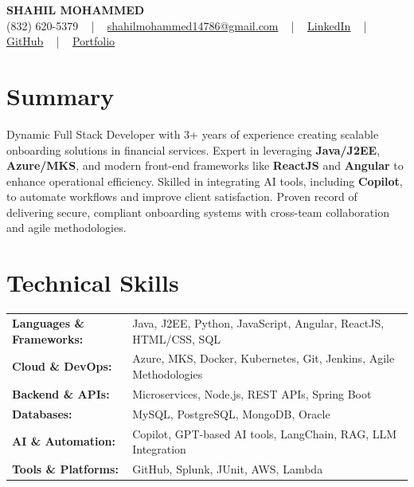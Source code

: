 \documentclass[letterpaper,11pt]{article}
\begin{document}
\begin{center}
    {\fontsize{14pt}{12pt}\selectfont \textbf{\MakeUppercase{Shahil Mohammed}}}\\ \vspace{2pt}
    \fontsize{10pt}{12pt}\selectfont (832) 620-5379 ~ | ~ \href{mailto:shahilmohammed14786@gmail.com}{shahilmohammed14786@gmail.com} ~ | ~  
    \href{https://www.linkedin.com/in/shahil-mohammed-9652931a1/}{\color{blue}\underline{LinkedIn}}  ~ | ~ 
    \href{https://github.com/freakbeast14}{\color{blue}\underline{GitHub}} ~ | ~ 
    \href{https://shahil-mohammed.netlify.app/}{\color{blue}\underline{Portfolio}}
    \vspace{-8pt}
\end{center}

\section{Summary}
\fontsize{9pt}{10pt}\selectfont
Dynamic Full Stack Developer with 3+ years of experience creating scalable onboarding solutions in financial services. Expert in leveraging \textbf{Java/J2EE}, \textbf{Azure/MKS}, and modern front-end frameworks like \textbf{ReactJS} and \textbf{Angular} to enhance operational efficiency. Skilled in integrating AI tools, including \textbf{Copilot}, to automate workflows and improve client satisfaction. Proven record of delivering secure, compliant onboarding systems with cross-team collaboration and agile methodologies.
 \vspace{-5pt}

\section{Technical Skills}
        \vspace{-14pt}
        \begin{table}[h]
            \fontsize{9pt}{10pt}\selectfont
            \begin{tabular}{p{0.3\linewidth} p{0.7\linewidth}}
                \textbf{Languages \& Frameworks:} & Java, J2EE, Python, JavaScript, Angular, ReactJS, HTML/CSS, SQL \\
                \textbf{Cloud \& DevOps:} & Azure, MKS, Docker, Kubernetes, Git, Jenkins, Agile Methodologies \\
                \textbf{Backend \& APIs:} & Microservices, Node.js, REST APIs, Spring Boot \\
                \textbf{Databases:} & MySQL, PostgreSQL, MongoDB, Oracle \\
                \textbf{AI \& Automation:} & Copilot, GPT-based AI tools, LangChain, RAG, LLM Integration \\
                \textbf{Tools \& Platforms:} & GitHub, Splunk, JUnit, AWS, Lambda \\
            \end{tabular}
        \end{table}
 \vspace{-15pt}
\end{document}
